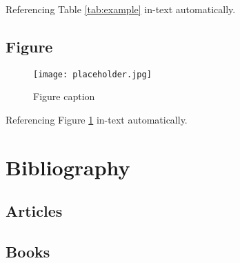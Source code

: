 \documentclass[11pt,fleqn]{book} %
\begin{document}
Referencing Table \ref{tab:example} in-text automatically.


\section{Figure}

\begin{figure}[h]
\centering\texttt{[image: placeholder.jpg]}
\caption{Figure caption}
\label{fig:placeholder} %
\end{figure}

Referencing Figure \ref{fig:placeholder} in-text automatically.


\chapter*{Bibliography}


\section*{Articles}
\printbibliography[heading=bibempty,type=article]


\section*{Books}
\printbibliography[heading=bibempty,type=book]


\cleardoublepage %
\setlength{\columnsep}{0.75cm} %
\printindex %

\end{document}
